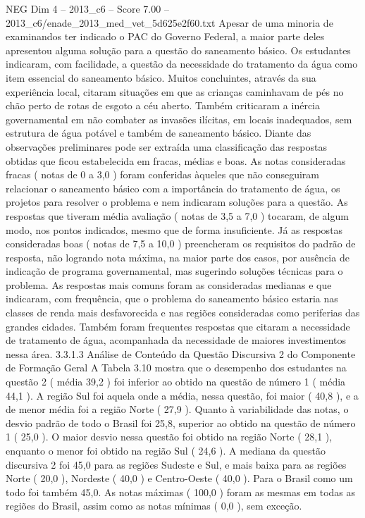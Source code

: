 \begin{textsample}{NEG Dim 4 – 2013\_c6 – Score 7.00 – 2013\_c6/enade\_2013\_med\_vet\_5d625e2f60.txt}
Apesar de uma minoria de examinandos ter indicado o PAC do Governo Federal, a maior parte deles apresentou alguma solução para a questão do saneamento básico.
Os estudantes indicaram, com facilidade, a questão da necessidade do tratamento da água como item essencial do saneamento básico.
Muitos concluintes, através da sua experiência local, citaram situações em que as crianças caminhavam de pés no chão perto de rotas de esgoto a céu aberto.
Também criticaram a inércia governamental em não combater as invasões ilícitas, em locais inadequados, sem estrutura de água potável e também de saneamento básico.
Diante das observações preliminares pode ser extraída uma classificação das respostas obtidas que ficou estabelecida em fracas, médias e boas.
As notas consideradas fracas ( notas de 0 a 3,0 ) foram conferidas àqueles que não conseguiram relacionar o saneamento básico com a importância do tratamento de água, os projetos para resolver o problema e nem indicaram soluções para a questão.
As respostas que tiveram média avaliação ( notas de 3,5 a 7,0 ) tocaram, de algum modo, nos pontos indicados, mesmo que de forma insuficiente.
Já as respostas consideradas boas ( notas de 7,5 a 10,0 ) preencheram os requisitos do padrão de resposta, não logrando nota máxima, na maior parte dos casos, por ausência de indicação de programa governamental, mas sugerindo soluções técnicas para o problema.
As respostas mais comuns foram as consideradas medianas e que indicaram, com frequência, que o problema do saneamento básico estaria nas classes de renda mais desfavorecida e nas regiões consideradas como periferias das grandes cidades.
Também foram frequentes respostas que citaram a necessidade de tratamento de água, acompanhada da necessidade de maiores investimentos nessa área. 3.3.1.3 Análise de Conteúdo da Questão Discursiva 2 do Componente de Formação Geral A Tabela 3.10 mostra que o desempenho dos estudantes na questão 2 ( média 39,2 ) foi inferior ao obtido na questão de número 1 ( média 44,1 ).
A região Sul foi aquela onde a média, nessa questão, foi maior ( 40,8 ), e a de menor média foi a região Norte ( 27,9 ).
Quanto à variabilidade das notas, o desvio padrão de todo o Brasil foi 25,8, superior ao obtido na questão de número 1 ( 25,0 ).
O maior desvio nessa questão foi obtido na região Norte ( 28,1 ), enquanto o menor foi obtido na região Sul ( 24,6 ).
A mediana da questão discursiva 2 foi 45,0 para as regiões Sudeste e Sul, e mais baixa para as regiões Norte ( 20,0 ), Nordeste ( 40,0 ) e Centro-Oeste ( 40,0 ).
Para o Brasil como um todo foi também 45,0.
As notas máximas ( 100,0 ) foram as mesmas em todas as regiões do Brasil, assim como as notas mínimas ( 0,0 ), sem exceção.

\end{textsample}

